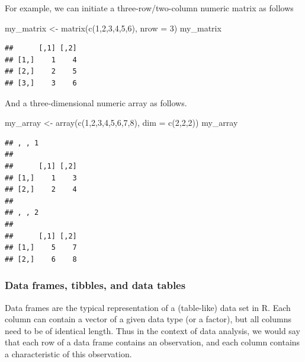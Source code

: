 \documentclass[
  12pt,
]{style/krantz}
\newenvironment{Shaded}{\begin{snugshade}}{\end{snugshade}}
\newcommand{\AttributeTok}[1]{\textcolor[rgb]{0.77,0.63,0.00}{#1}}
\newcommand{\DecValTok}[1]{\textcolor[rgb]{0.00,0.00,0.81}{#1}}
\newcommand{\FunctionTok}[1]{\textcolor[rgb]{0.00,0.00,0.00}{#1}}
\newcommand{\NormalTok}[1]{#1}
\newcommand{\OtherTok}[1]{\textcolor[rgb]{0.56,0.35,0.01}{#1}}
\begin{document}
For example, we can initiate a three-row/two-column numeric matrix as follows

\begin{Shaded}
\begin{Highlighting}[]
\NormalTok{my\_matrix }\OtherTok{\textless{}{-}} \FunctionTok{matrix}\NormalTok{(}\FunctionTok{c}\NormalTok{(}\DecValTok{1}\NormalTok{,}\DecValTok{2}\NormalTok{,}\DecValTok{3}\NormalTok{,}\DecValTok{4}\NormalTok{,}\DecValTok{5}\NormalTok{,}\DecValTok{6}\NormalTok{), }\AttributeTok{nrow =} \DecValTok{3}\NormalTok{)}
\NormalTok{my\_matrix}
\end{Highlighting}
\end{Shaded}

\begin{verbatim}
##      [,1] [,2]
## [1,]    1    4
## [2,]    2    5
## [3,]    3    6
\end{verbatim}

And a three-dimensional numeric array as follows.

\begin{Shaded}
\begin{Highlighting}[]
\NormalTok{my\_array }\OtherTok{\textless{}{-}} \FunctionTok{array}\NormalTok{(}\FunctionTok{c}\NormalTok{(}\DecValTok{1}\NormalTok{,}\DecValTok{2}\NormalTok{,}\DecValTok{3}\NormalTok{,}\DecValTok{4}\NormalTok{,}\DecValTok{5}\NormalTok{,}\DecValTok{6}\NormalTok{,}\DecValTok{7}\NormalTok{,}\DecValTok{8}\NormalTok{), }\AttributeTok{dim =} \FunctionTok{c}\NormalTok{(}\DecValTok{2}\NormalTok{,}\DecValTok{2}\NormalTok{,}\DecValTok{2}\NormalTok{))}
\NormalTok{my\_array}
\end{Highlighting}
\end{Shaded}

\begin{verbatim}
## , , 1
## 
##      [,1] [,2]
## [1,]    1    3
## [2,]    2    4
## 
## , , 2
## 
##      [,1] [,2]
## [1,]    5    7
## [2,]    6    8
\end{verbatim}

\hypertarget{data-frames-tibbles-and-data-tables}{%
\subsubsection{Data frames, tibbles, and data tables}\label{data-frames-tibbles-and-data-tables}}

Data frames are the typical representation of a (table-like) data set in R. Each column can contain a vector of a given data type (or a factor), but all columns need to be of identical length. Thus in the context of data analysis, we would say that each row of a data frame contains an observation, and each column contains a characteristic of this observation.
\end{document}
